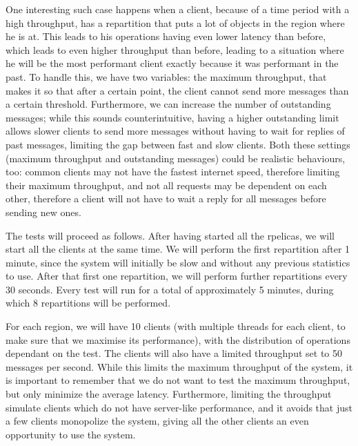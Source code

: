 One interesting such case happens when a client, because of a time period with a high throughput, has a repartition that puts a lot of objects in the region where he is at. This leads to his operations having even lower latency than before, which leads to even higher throughput than before, leading to a situation where he will be the most performant client exactly because it was performant in the past. To handle this, we have two variables: the maximum throughput, that makes it so that after a certain point, the client cannot send more messages than a certain threshold. Furthermore, we can increase the number of outstanding messages; while this sounds counterintuitive, having a higher outstanding limit allows slower clients to send more messages without having to wait for replies of past messages, limiting the gap between fast and slow clients. Both these settings (maximum throughput and outstanding messages) could be realistic behaviours, too: common clients may not have the fastest internet speed, therefore limiting their maximum throughput, and not all requests may be dependent on each other, therefore a client will not have to wait a reply for all messages before sending new ones.

The tests will proceed as follows. After having started all the rpelicas, we will start all the clients at the same time. We will perform the first repartition after 1 minute, since the system will initially be slow and without any previous statistics to use. After that first one repartition, we will perform further repartitions every 30 seconds. Every test will run for a total of approximately 5 minutes, during which 8 repartitions will be performed.

For each region, we will have 10 clients (with multiple threads for each client, to make sure that we maximise its performance), with the distribution of operations dependant on the test. The clients will also have a limited throughput set to 50 messages per second. While this limits the maximum throughput of the system, it is important to remember that we do not want to test the maximum throughput, but only minimize the average latency. Furthermore, limiting the throughput simulate clients which do not have server-like performance, and it avoids that just a few clients monopolize the system, giving all the other clients an even opportunity to use the system.

